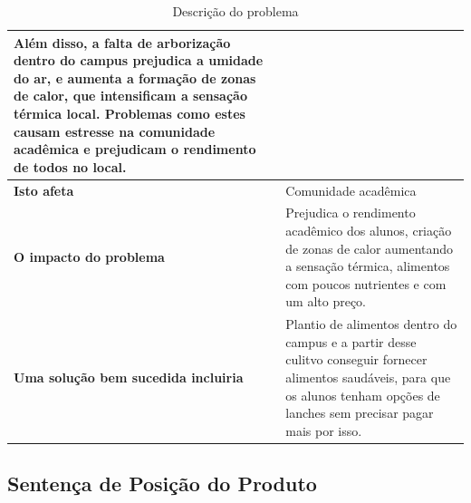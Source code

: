\begin{table}[!htb]
\begin{tabular}{p{3cm}p{13cm}}
                                                     Além disso, a falta de arborização dentro do campus prejudica a umidade do ar, e
                                                     aumenta a formação de zonas de calor, que intensificam a sensação térmica local.
                                                     Problemas como estes causam estresse na comunidade acadêmica e prejudicam o
                                                     rendimento de todos no local.                                                                 \\ \midrule
      \textbf{Isto afeta}                          & Comunidade acadêmica                                                                   \\ \midrule
      \textbf{O impacto do problema}               & Prejudica o rendimento acadêmico dos alunos, criação de zonas de calor aumentando a
                                                     sensação térmica, alimentos com poucos nutrientes e com um alto preço.                 \\ \midrule
      \textbf{Uma solução bem sucedida incluiria}  & Plantio de alimentos dentro do campus e a partir desse culitvo conseguir fornecer alimentos
                                                     saudáveis, para que os alunos tenham opções de lanches sem precisar pagar mais por isso.    \\
      \bottomrule
    \end{tabular}
    \caption{Descrição do problema}
  \end{table}

\subsection{Sentença de Posição do Produto}

